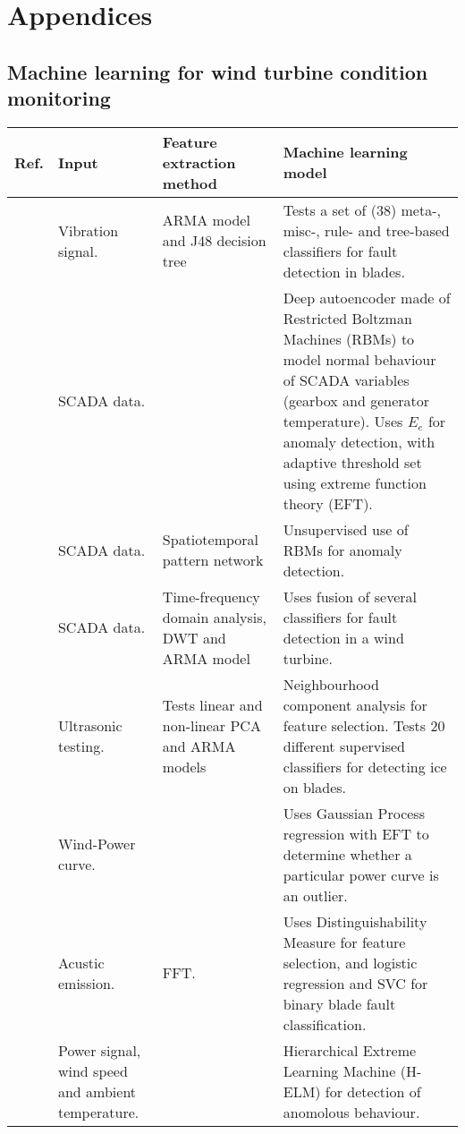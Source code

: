 \chapter{Appendices}

\section{Machine learning for wind turbine condition monitoring}

\begin{longtable}{p{}p{}p{}p{}}
    \hline
    Ref. & Input & Feature extraction method & Machine learning model \\
    \hline \hline
    \cite{ml_cm_wt_blade_ARMA_2018} & Vibration signal. & ARMA model and J48 decision tree & Tests a set of (38) meta-, misc-, rule- and tree-based classifiers for fault detection in blades. \\  \hline
    \cite{AD_and_fault_analysis_wt_DAE} & SCADA data. & & Deep autoencoder made of Restricted Boltzman Machines (RBMs) to model normal behaviour of SCADA variables (gearbox and generator temperature). Uses $E_e$ for anomaly detection, with adaptive threshold set using extreme function theory (EFT). \\ \hline
    \cite{unsup_graphical_modeling_wt_cm} & SCADA data. & Spatiotemporal pattern network & Unsupervised use of RBMs for anomaly detection. \\ \hline
    \cite{fault_detection_and_isolation_using_classifier_fusion} & SCADA data. & Time-frequency domain analysis, DWT and ARMA model & Uses fusion of several classifiers for fault detection in a wind turbine.  \\ \hline
    \cite{lin_and_non_lin_feat_for_ice_detection_on_blades} & Ultrasonic testing. & Tests linear and non-linear PCA and ARMA models & Neighbourhood component analysis for feature selection. Tests 20 different supervised classifiers for detecting ice on blades. \\ \hline
    \cite{perf_mon_of_wt_using_extreme_func_theory} & Wind-Power curve. &  & Uses Gaussian Process regression with EFT to determine whether a particular power curve is an outlier.\\ \hline
    \cite{blade_damage_detection_sup_ml_alg} & Acustic emission. & FFT. & Uses Distinguishability Measure for feature selection, and logistic regression and SVC for binary blade fault classification. \\ \hline
    \cite{wt_cm_using_cloud_computing_and_HELM} & Power signal, wind speed and ambient temperature. & & Hierarchical Extreme Learning Machine (H-ELM) for detection of anomolous behaviour. \\ \hline

\end{longtable}
